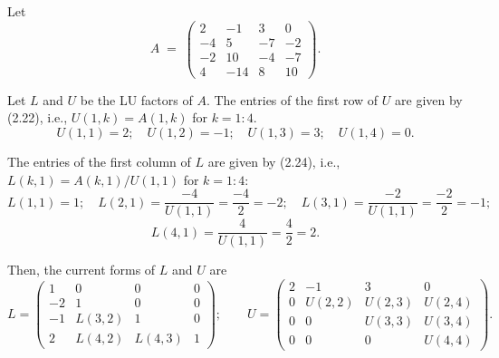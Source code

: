 \begin{examplex}
Let
\begin{equation}
A \;=\; \begin{pmatrix} 2 & -1 & 3 & 0 \\ -4 & 5 & -7 & -2 \\ -2 & 10 & -4 & -7 \\ 4 & -14 & 8 & 10 \end{pmatrix}.
\end{equation}

Let $L$ and $U$ be the LU factors of $A$. The entries of the first row of $U$
are given by (2.22), i.e., $U(1,k)=A(1,k)$ for $k=1:4$.
\[
U(1,1)=2; \quad U(1,2)=-1; \quad U(1,3)=3; \quad U(1,4)=0.
\]

The entries of the first column of $L$ are given by (2.24), i.e.,
$L(k,1) = A(k,1)/U(1,1)$ for $k=1:4$:
\[
L(1,1)=1; \quad L(2,1)=\frac{-4}{U(1,1)}=\frac{-4}{2}=-2; \quad L(3,1)=\frac{-2}{U(1,1)}=\frac{-2}{2}=-1;
\]
\[
L(4,1)=\frac{4}{U(1,1)}=\frac{4}{2}=2.
\]

Then, the current forms of $L$ and $U$ are
\begin{equation}
L=\begin{pmatrix} 1 & 0 & 0 & 0 \\ -2 & 1 & 0 & 0 \\ -1 & L(3,2) & 1 & 0 \\ 2 & L(4,2) & L(4,3) & 1 \end{pmatrix};
\qquad
U=\begin{pmatrix} 2 & -1 & 3 & 0 \\ 0 & U(2,2) & U(2,3) & U(2,4) \\ 0 & 0 & U(3,3) & U(3,4) \\ 0 & 0 & 0 & U(4,4) \end{pmatrix}.
\end{equation}


\end{examplex}
